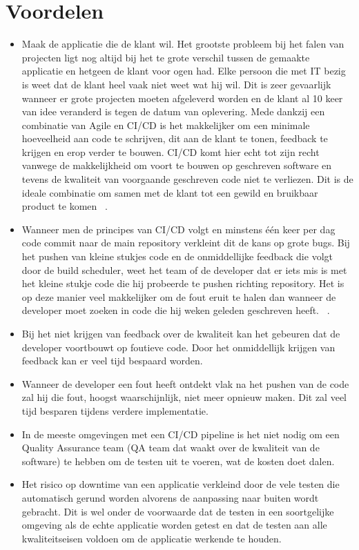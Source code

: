     \section{Voordelen}
    \begin{itemize}
        \item Maak de applicatie die de klant wil. Het grootste probleem bij het falen van projecten ligt nog altijd bij het te grote verschil tussen de gemaakte applicatie en hetgeen de klant voor ogen had. Elke persoon die met IT bezig is weet dat de klant heel vaak niet weet wat hij wil. Dit is zeer gevaarlijk wanneer er grote projecten moeten afgeleverd worden en de klant al 10 keer van idee veranderd is tegen de datum van oplevering. Mede dankzij een combinatie van Agile en CI/CD is het makkelijker om een minimale hoeveelheid aan code te schrijven, dit aan de klant te tonen, feedback te krijgen en erop verder te bouwen. CI/CD komt hier echt tot zijn recht vanwege de makkelijkheid om voort te bouwen op geschreven software en tevens de kwaliteit van voorgaande geschreven code niet te verliezen. Dit is de ideale combinatie om samen met de klant tot een gewild en bruikbaar product te komen ~\autocite{Humble2012}.
        \item Wanneer men de principes van CI/CD volgt en minstens één keer per dag code commit naar de main repository verkleint dit de kans op grote bugs. Bij het pushen van kleine stukjes code en de onmiddellijke feedback die volgt door de build scheduler, weet het team of de developer dat er iets mis is met het kleine stukje code die hij probeerde te pushen richting repository. Het is op deze manier veel makkelijker om de fout eruit te halen dan wanneer de developer moet zoeken in code die hij weken geleden geschreven heeft. ~\autocite{Fowler2006}.
        \item Bij het niet krijgen van feedback over de kwaliteit kan het gebeuren dat de developer voortbouwt op foutieve code. Door het onmiddellijk krijgen van feedback kan er veel tijd bespaard worden.
        \item Wanneer de developer een fout heeft ontdekt vlak na het pushen van de code zal hij die fout, hoogst waarschijnlijk, niet meer opnieuw maken. Dit zal veel tijd besparen tijdens verdere implementatie.
        \item In de meeste omgevingen met een CI/CD pipeline is het niet nodig om een Quality Assurance team (QA team dat waakt over de kwaliteit van de software) te hebben om de testen uit te voeren, wat de kosten doet dalen.
        \item Het risico op downtime van een applicatie verkleind door de vele testen die automatisch gerund worden alvorens de aanpassing naar buiten wordt gebracht. Dit is wel onder de voorwaarde dat de testen in een soortgelijke omgeving als de echte applicatie worden getest en dat de testen aan alle kwaliteitseisen voldoen om de applicatie werkende te houden.

\end{itemize}
